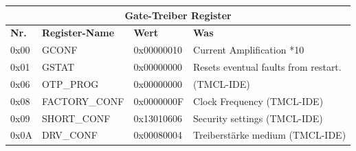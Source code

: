 \begin{table}[H]
\centering
\begin{tabular}{|l|l|l|l|}
\hline
\multicolumn{4}{|c|}{\textbf{Gate-Treiber Register}}          \\ \hline
\textbf{Nr.} & \textbf{Register-Name} & \textbf{Wert}       & \textbf{Was} \\ \hline
0x00         & GCONF         & 0x00000010 & Current Amplification *10    \\ \hline
0x01         & GSTAT         & 0x00000000 & Resets eventual faults from restart.    \\ \hline
0x06         & OTP\_PROG     & 0x00000000 & (TMCL-IDE)    \\ \hline
0x08         & FACTORY\_CONF & 0x0000000F & Clock Frequency (TMCL-IDE)    \\ \hline
0x09         & SHORT\_CONF   & 0x13010606 & Security settings (TMCL-IDE)    \\ \hline
0x0A         & DRV\_CONF     & 0x00080004 & Treiberstärke medium (TMCL-IDE)    \\ \hline
\end{tabular}
\end{table}
